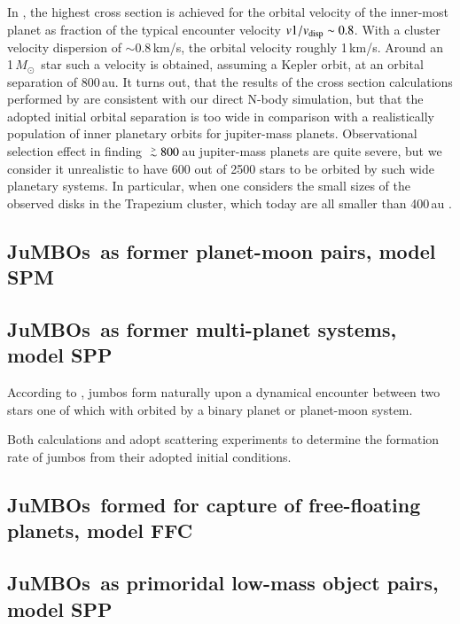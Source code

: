 \documentclass[aa]{lib/aa}
\newcommand{\MSun}{\mbox{${M}_\odot$}}
\def\apgt{\ {\raise-.5ex\hbox{$\buildrel>\over\sim$}}\ }
\newcommand{\jumbos}{\mbox{JuMBOs}}
\begin{document}
In \cite{2023arXiv231006016W}, the highest cross section is achieved
for the orbital velocity of the inner-most planet as fraction of the
typical encounter velocity $v1/v_{\rm disp} \sim 0.8$. With a cluster
velocity dispersion of $\sim 0.8$\,km/s, the orbital velocity roughly
1\,km/s. Around an 1\,\MSun\, star such a velocity is obtained,
assuming a Kepler orbit, at an orbital separation of 800\,au. It turns
out, that the results of the cross section calculations performed by
\cite{2023arXiv231006016W} are consistent with our direct N-body
simulation, but that the adopted initial orbital separation is too
wide in comparison with a realistically population of inner planetary
orbits for jupiter-mass planets.  Observational selection effect in
finding $\apgt 800$\,au jupiter-mass planets are quite severe, but we
consider it unrealistic to have 600 out of 2500 stars to be orbited by
such wide planetary systems. In particular, when one considers the
small sizes of the observed disks in the Trapezium cluster, which
today are all smaller than 400\,au \citep{2005A&A...441..195V}.

\subsection{\jumbos\, as former planet-moon pairs, model {\cal SPM}}


\subsection{\jumbos\, as former multi-planet systems, model {\cal SPP}}

According to \cite{2023arXiv231015603C}, jumbos form naturally upon a
dynamical encounter between two stars one of which with orbited by a
binary planet or planet-moon system.

Both calculations \cite{2023arXiv231006016W} and
\cite{2023arXiv231015603C} adopt scattering experiments to determine
the formation rate of jumbos from their adopted initial conditions.

\subsection{\jumbos\, formed for capture of free-floating planets, model {\cal FFC}}

\subsection{\jumbos\, as primoridal low-mass object pairs, model {\cal SPP}}
\end{document}
